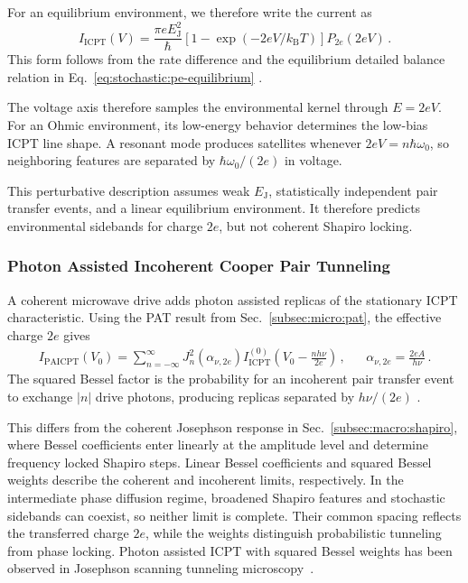         For an equilibrium environment, we therefore write the current as
        \begin{equation}
            I_\mathrm{ICPT}(V)
            = \frac{\pi eE_\mathrm{J}^{2}}{\hbar}\left[1-\exp(-2eV/k_\mathrm{B}T)\right]P_{2e}(2eV)\,.
            \label{eq:stochastic:icpt:current}
        \end{equation}
        This form follows from the rate difference and the equilibrium detailed balance relation in Eq.~\eqref{eq:stochastic:pe-equilibrium} \cite{ingold_charge_1992}.

        The voltage axis therefore samples the environmental kernel through $E=2eV$. For an Ohmic environment, its low-energy behavior determines the low-bias ICPT line shape. A resonant mode produces satellites whenever $2eV=n\hbar\omega_0$, so neighboring features are separated by $\hbar\omega_0/(2e)$ in voltage.

        This perturbative description assumes weak $E_\mathrm{J}$, statistically independent pair transfer events, and a linear equilibrium environment. It therefore predicts environmental sidebands for charge $2e$, but not coherent Shapiro locking.

        \subsubsection*{Photon Assisted Incoherent Cooper Pair Tunneling}

            A coherent microwave drive adds photon assisted replicas of the stationary ICPT characteristic. Using the PAT result from Sec.~\ref{subsec:micro:pat}, the effective charge $2e$ gives
            \begin{align}
                I_\mathrm{PAICPT}(V_0)
                = \sum_{n=-\infty}^{\infty}J_n^2\!\left(\alpha_{\nu,2e}\right)
                I_\mathrm{ICPT}^{(0)}\!\left(V_0-\frac{nh\nu}{2e}\right)\,, &&
                \alpha_{\nu,2e}=\frac{2eA}{h\nu}\,.
            \end{align}
            The squared Bessel factor is the probability for an incoherent pair transfer event to exchange $|n|$ drive photons, producing replicas separated by $h\nu/(2e)$ \cite{falci_quasiparticle_1991,roychowdhury_microwave_2015}.

            This differs from the coherent Josephson response in Sec.~\ref{subsec:macro:shapiro}, where Bessel coefficients enter linearly at the amplitude level and determine frequency locked Shapiro steps. Linear Bessel coefficients and squared Bessel weights describe the coherent and incoherent limits, respectively. In the intermediate phase diffusion regime, broadened Shapiro features and stochastic sidebands can coexist, so neither limit is complete. Their common spacing reflects the transferred charge $2e$, while the weights distinguish probabilistic tunneling from phase locking. Photon assisted ICPT with squared Bessel weights has been observed in Josephson scanning tunneling microscopy~\cite{roychowdhury_microwave_2015}.

